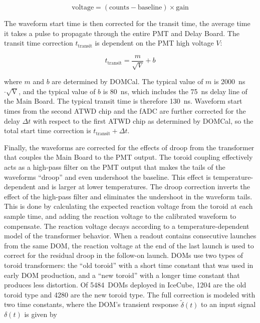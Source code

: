 \begin{equation}
  \mathrm{voltage} = \mathrm{(counts - baseline) \times gain}
\end{equation}

The waveform start time is then corrected for the transit time,
the average time it takes a pulse to propagate through the entire
PMT and Delay Board. The transit time correction $t_{\mathrm{transit}}$ is
dependent on the PMT high voltage $V$:

\begin{equation}
  t_{\mathrm{transit}} = \frac{m}{\sqrt{V}} + b
\end{equation}

\noindent where $m$ and $b$ are determined by DOMCal. The typical value of $m$
is 2000~ns$\cdot \sqrt{\mathrm{V}}$, and the typical value of $b$ is
80~ns, which includes the 75~ns delay line of the Main Board. The
typical transit time is therefore 130~ns.  Waveform start times from the
second ATWD chip and the fADC are further 
corrected for the delay $\Delta t$ with respect to the first ATWD
chip as determined by DOMCal, so the total start time correction is
$t_{\mathrm{transit}} + \Delta t$. 

Finally, the waveforms are corrected for the effects of droop from the
transformer that couples the Main Board to the PMT output. The toroid
coupling effectively acts as a high-pass filter on the PMT output
that makes the tails of the waveforms ``droop'' and even
undershoot the baseline. This effect is temperature-dependent and is larger
at lower temperatures. The droop correction inverts the effect of the high-pass
filter and eliminates the undershoot in the waveform tails. This is
done by calculating the expected reaction voltage from the toroid at
each sample time, and adding the reaction voltage to the calibrated waveform
to compensate. The reaction voltage decays 
according to a temperature-dependent model of the transformer behavior. 
When a readout contains consecutive launches from the same
DOM, the reaction voltage at the end of the last launch is used to
correct for the residual droop in the follow-on launch.  DOMs
use two types of toroid transformers: the ``old toroid'' with a short
time constant that was used in early DOM production, and a ``new
toroid'' with a longer time constant that produces less
distortion. Of 5484~DOMs deployed in IceCube, 1204 are the old
toroid type and 4280 are the new toroid type. The full correction is modeled with two time constants,
where the DOM's transient response $\tilde{\delta}(t)$ to an input
signal $\delta(t)$ is given by

